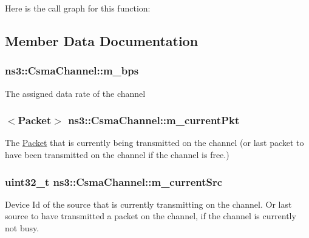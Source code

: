 Here is the call graph for this function\+:




\subsection{Member Data Documentation}
\subsubsection[{\texorpdfstring{m\+\_\+bps}{m_bps}}]{ ns3\+::\+Csma\+Channel\+::m\+\_\+bps\hspace{0.3cm}{\ttfamily [private]}}\hypertarget{classns3_1_1CsmaChannel_a425f675d8d438b5616541c1066b191ff}{}\label{classns3_1_1CsmaChannel_a425f675d8d438b5616541c1066b191ff}
The assigned data rate of the channel 
\subsubsection[{\texorpdfstring{m\+\_\+current\+Pkt}{m_currentPkt}}]{$<${\bf Packet}$>$ ns3\+::\+Csma\+Channel\+::m\+\_\+current\+Pkt\hspace{0.3cm}{\ttfamily [private]}}\hypertarget{classns3_1_1CsmaChannel_aa6402963543ed7ae413acb321a66101b}{}\label{classns3_1_1CsmaChannel_aa6402963543ed7ae413acb321a66101b}
The \hyperlink{classns3_1_1Packet}{Packet} that is currently being transmitted on the channel (or last packet to have been transmitted on the channel if the channel is free.) 
\subsubsection[{\texorpdfstring{m\+\_\+current\+Src}{m_currentSrc}}]{\setlength{\rightskip}{0pt plus 5cm}uint32\+\_\+t ns3\+::\+Csma\+Channel\+::m\+\_\+current\+Src\hspace{0.3cm}{\ttfamily [private]}}\hypertarget{classns3_1_1CsmaChannel_af6c1065e71e65be876ab8968c9d54c83}{}\label{classns3_1_1CsmaChannel_af6c1065e71e65be876ab8968c9d54c83}
Device Id of the source that is currently transmitting on the channel. Or last source to have transmitted a packet on the channel, if the channel is currently not busy. 
